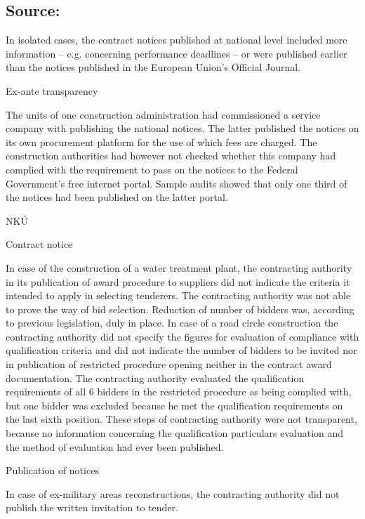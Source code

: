 \documentclass[10pt]{article}
\begin{document}
\subsection*{Source:}

In isolated cases, the contract notices published at national level included more information – e.g. concerning performance deadlines – or were published earlier than the notices published in the European Union’s Official Journal.


Ex-ante transparency

The units of one construction administration had commissioned a service company with publishing the national notices.
The latter published the notices on its own procurement platform for the use of which fees are charged.
The construction authorities had however not checked whether this company had complied with the requirement to pass on the notices to the Federal Government’s free internet portal.
Sample audits showed that only one third of the notices had been published on the latter portal.


NKÚ



Contract notice

In case of the construction of a water treatment plant, the contracting authority in its publication of award procedure to suppliers did not indicate the criteria it intended to apply in selecting tenderers.
The contracting authority was not able to prove the way of bid selection.
Reduction of number of bidders was, according to previous legislation, duly in place.
In case of a road circle construction the contracting authority did not specify the figures for evaluation of compliance with qualification criteria and did not indicate the number of bidders to be invited nor in publication of restricted procedure opening neither in the contract award documentation.
The contracting authority evaluated the qualification requirements of all 6 bidders in the restricted procedure as being complied with, but one bidder was excluded because he met the qualification requirements on the last sixth position.
These steps of contracting authority were not transparent, because no information concerning the qualification particulars evaluation and the method of evaluation had ever been published.


Publication of notices

In case of ex-military areas reconstructions, the contracting authority did not publish the written invitation to tender.
\end{document}
